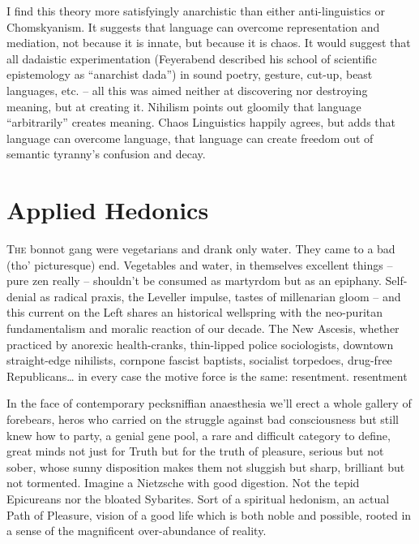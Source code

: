 \documentclass[a4paper,english,10pt,twoside]{article}
\begin{document}
\medskip
I find this theory more satisfyingly anarchistic than either anti-linguistics or Chomskyanism. It suggests that language can overcome representation and mediation, not because it is innate, but because it is chaos. It would suggest that all dadaistic experimentation (Feyerabend described his school of scientific epistemology as \enquote{anarchist dada}) in sound poetry, gesture, cut-up, beast languages, etc. -- all this was aimed neither at discovering nor destroying meaning, but at creating it. Nihilism points out gloomily that language \enquote{arbitrarily} creates meaning. Chaos Linguistics happily agrees, but adds that language can overcome language, that language can create freedom out of semantic tyranny's confusion and decay.

\section{Applied Hedonics}

\lettrine{T}{he} bonnot gang were vegetarians and drank only water. They came to a bad (tho' picturesque) end. Vegetables and water, in themselves excellent things -- pure zen really -- shouldn't be consumed as martyrdom but as an epiphany. Self-denial as radical praxis, the Leveller impulse, tastes of millenarian gloom -- and this current on the Left shares an historical wellspring with the neo-puritan fundamentalism and moralic reaction of our decade. The New Ascesis, whether practiced by anorexic health-cranks, thin-lipped police sociologists, downtown straight-edge nihilists, cornpone fascist baptists, socialist torpedoes, drug-free Republicans… in every case the motive force is the same: resentment. resentment

\medskip
In the face of contemporary pecksniffian anaesthesia we'll erect a whole gallery of forebears, heros who carried on the struggle against bad consciousness but still knew how to party, a genial gene pool, a rare and difficult category to define, great minds not just for Truth but for the truth of pleasure, serious but not sober, whose sunny disposition makes them not sluggish but sharp, brilliant but not tormented. Imagine a Nietzsche with good digestion. Not the tepid Epicureans nor the bloated Sybarites. Sort of a spiritual hedonism, an actual Path of Pleasure, vision of a good life which is both noble and possible, rooted in a sense of the magnificent over-abundance of reality.
\end{document}
